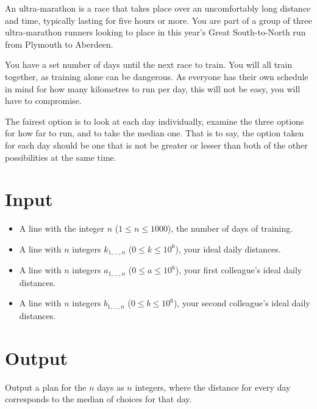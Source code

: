 
\providecommand\maxn{}
\renewcommand{\maxn}{1000}

An ultra-marathon is a race that takes place over an uncomfortably long distance
and time, typically lasting for five hours or more. You are part of a group of
three ultra-marathon runners looking to place in this year's Great South-to-North
run from Plymouth to Aberdeen.

You have a set number of days until the next race to train. You will all train
together, as training alone can be dangerous. As everyone has their own schedule
in mind for how many kilometres to run per day, this will not be easy, you will
have to compromise.

The fairest option is to look at each day individually, examine the three options
for how far to run, and to take the median one. That is to say, the option taken
for each day should be one that is not be greater or lesser than both of the
other possibilities at the same time.

\section*{Input}
	\begin{itemize}
		\item A line with the integer $n$ ($1\leq n\leq\maxn$), the number of days of training.
		\item A line with $n$ integers $k_{1,\ldots,n}$ ($0\leq k \leq 10^6$), your ideal daily distances.
		\item A line with $n$ integers $a_{1,\ldots,n}$ ($0\leq a \leq 10^6$), your first colleague's ideal daily distances.
		\item A line with $n$ integers $b_{1,\ldots,n}$ ($0\leq b \leq 10^6$), your second colleague's ideal daily distances.
	\end{itemize}

\section*{Output}
  Output a plan for the $n$ days as $n$ integers, where the distance for every day
  corresponds to the median of choices for that day.
